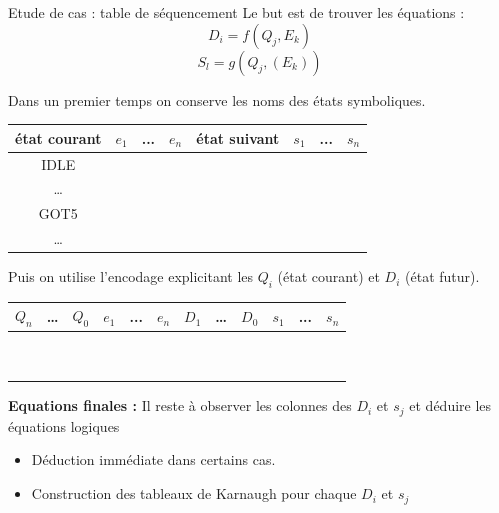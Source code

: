 \begin{frame}{Etude de cas : table de séquencement}
  Le but est de trouver les équations :   $$ D_i=f(Q_j,E_k) $$
    $$ S_l=g(Q_j,(E_k)) $$


Dans un premier temps on conserve les noms des états symboliques.
{\footnotesize
\begin{table}[!htb]
  \centering

  \begin{tabular}{|c|c|c|c||c|c|c|c|}
        \hline
        \cellcolor{blue!25} état courant & $e_1$ & ... & $e_n$ &  \cellcolor{red!25} état suivant & $s_1$ & ... & $s_n$ \\ \hline
        IDLE        & ~    & ~     & ~            & ~            & ~        & ~   & ~    \\ \hline
        \dots       & ~    & ~     & ~            & ~            & ~        & ~   & ~    \\ \hline
        GOT5        & ~    & ~     & ~            & ~            & ~        & ~   & ~    \\ \hline
        \dots       & ~    & ~     & ~            & ~            & ~        & ~   & ~    \\ \hline
    \end{tabular}
\end{table}
}

Puis on utilise l'encodage explicitant les $Q_i$ (état courant) et $D_i$ (état futur).
{\footnotesize
\begin{table}[!htb]
  \centering
    \begin{tabular}{|c|c|c|c|c|c||c|c|c|c|c|c|}
        \hline
        \cellcolor{blue!25}$Q_n$ & \cellcolor{blue!25}\dots & \cellcolor{blue!25} $Q_0$ &  $e_1$ & ... & $e_n$ & \cellcolor{red!25}$D_1$ & \cellcolor{red!25}\dots & \cellcolor{red!25}$D_0$ & $s_1$ & ... & $s_n$ \\ \hline
        ~   & ~    & ~  & ~  & ~  & ~  & ~  & ~  & ~        & ~   & ~ & ~        \\
        ~   & ~    & ~  & ~  & ~  & ~  & ~  & ~  & ~        & ~   & ~ & ~        \\
        \hline
    \end{tabular}
\end{table}
}
\textbf{Equations finales : }
Il reste à observer les colonnes des $D_i$ et $s_j$ et déduire les équations logiques
  \begin{itemize}
    \item Déduction immédiate dans certains cas.
    \item Construction des tableaux de Karnaugh pour chaque $D_i$ et $s_j$
  \end{itemize}
\end{frame}

